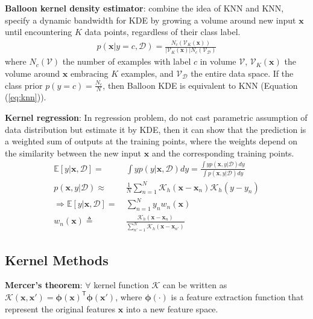 \textbf{Balloon kernel density estimator}: combine the idea of KNN and KNN, 
specify a dynamic bandwidth for KDE by growing a volume around new input $\bm{x}$ 
until encountering $K$ data points, regardless of their class label.
\begin{gather}
    p(\bm{x}|y=c,\mathcal{D})=\frac{N_c(\mathcal{V}_K(\bm{x}))}{|\mathcal{V}_K(\bm{x})|N_c(\mathcal{V}_\mathcal{D})}
\end{gather}
where $N_c(\mathcal{V})$ the number of examples with label $c$ in volume $\mathcal{V}$, 
$\mathcal{V}_K(\bm{x})$ the volume around $\bm{x}$ embracing $K$ examples, and
$\mathcal{V}_\mathcal{D}$ the entire data space. If the class prior $p(y=c)=\frac{N_c}{N}$,
then Balloon KDE is equivalent to KNN (Equation (\ref{eq:knn})).


\textbf{Kernel regression}:
In regression problem, do not cast parametric assumption of data distribution but estimate it by KDE, 
then it can show that the prediction is a weighted sum of outputs at the training points, 
where the weights depend on the similarity between the new input $\bm{x}$ and the corresponding training points.
\begin{align}
    \mathbb{E}[y|\bm{x},\mathcal{D}]
    =&~ \int{yp(y|\bm{x},\mathcal{D})}dy=\frac{\int{yp(\bm{x},y|\mathcal{D})}dy}{\int{p(\bm{x},y|\mathcal{D})}dy} \\
    p(\bm{x},y|\mathcal{D})
    \approx&~ \frac{1}{N}\sum_{n=1}^N\mathcal{K}_h(\bm{x}-\bm{x}_n)\mathcal{K}_h(y-y_n) \\
    \Rightarrow \mathbb{E}[y|\bm{x},\mathcal{D}]
    =&~\sum_{n=1}^N y_nw_n(\bm{x})\\
    w_n(\bm{x})
    \triangleq&~ \frac{\mathcal{K}_h(\bm{x}-\bm{x}_n)}{\sum_{n'=1}^N\mathcal{K}_h(\bm{x}-\bm{x}_{n'})}
\end{align}




\subsection{Kernel Methods}


\textbf{Mercer’s theorem}: $\forall$ kernel function $\mathcal{K}$ can be written as $\mathcal{K}(\bm{x},\bm{x}')=\bm{\phi}(\bm{x})^\mathsf{T}\bm{\phi}(\bm{x}')$,
where $\bm{\phi}(\cdot)$ is a feature extraction function that represent the original features $\bm{x}$ into a new feature space.

